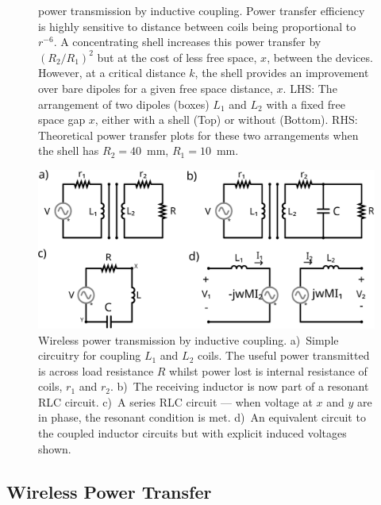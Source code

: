 \documentclass[11pt]{iopart}
\begin{document}
\begin{figure}
{    power transmission by inductive coupling. Power transfer efficiency is highly sensitive
    to distance between coils being proportional to $r^{-6}$. A
    concentrating shell increases this power transfer by $(R_2/R_1)^2$
    but at the cost of less free space, $x$, between the
    devices. However, at a critical distance $k$, the shell provides
    an improvement over bare dipoles for a given free space distance,
    $x$. LHS: The arrangement of two dipoles (boxes) $L_1$ and $L_2$
    with a fixed free space gap $x$, either with a shell (Top) or
    without (Bottom). RHS: Theoretical power transfer plots for these
    two arrangements when the shell has $R_2 = 40$~mm, $R_1 =
    10$~mm.}\label{fig:d_motiv}
\end{figure}

\begin{figure}
  \begin{center}
   \noindent\includegraphics[width=0.65\linewidth]{images/WPT.pdf}
  \end{center}
  \caption{Wireless power transmission by inductive
    coupling. a)~Simple circuitry for coupling $L_1$ and $L_2$
    coils. The useful power transmitted is across load resistance $R$
    whilst power lost is internal resistance of coils, $r_1$ and
    $r_2$. b)~The receiving inductor is now part of a resonant RLC
    circuit. c)~A series RLC circuit --- when voltage at $x$ and $y$
    are in phase, the resonant condition is met. d)~An equivalent
    circuit to the coupled inductor circuits but with explicit induced
    voltages shown. }\label{fig:WPT}
\end{figure}

\subsection{Wireless Power Transfer}
\end{document}
